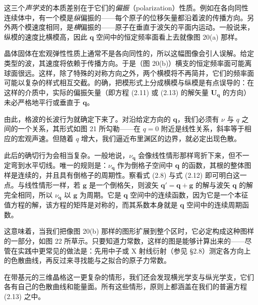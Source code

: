 这三个\emph{声学支}的本质差别在于它们的\emph{偏振}（polarization）性质。例如在各向同性连续体中，有一个模是\emph{纵}偏振的——每个原子的位移矢量都沿着波的传播方向。另外两个模速度相同，是\emph{横}偏振的——原子在垂直于波矢的平面内运动。一般说来，纵模的速度比横模高，因此 $\boldsymbol{q}$ 空间中的恒定频率面看上去就像图 20(a) 那样。

晶体固体在宏观弹性性质上通常不是各向同性的，所以这幅图像会引人误解。给定类型的波，其速度将依赖于传播方向。于是（图 20(b)）横支的恒定频率面可能离球面很远。这样，除了特殊的对称方向之外，两个横模将不再简并，它们的频率面可能以复杂的样式相互交截。的确，把模形式上分成横模与纵模是有点误导的：在这样的介质中，实际的偏振矢量（即方程 (2.11) 或 (2.13) 的解矢量 $\mathbf{U}_{\boldsymbol{q}}$ 的方向）未必严格地平行或垂直于 $\boldsymbol{q}$。

由此，格波的长波行为就确定下来了。对沿给定方向的 $\boldsymbol{q}$，我们必须有 $\nu$ 与 $q$ 之间的一个关系，其形式如图 21 所勾勒——在 $q = 0$ 附近是线性关系，斜率等于相应的宏观声速。但随着 $q$ 增大，我们逼近布里渊区的边界，就必定出现色散。


此后的确切行为会相当复杂。一般地说，$\nu_{\boldsymbol{q}}$ 会像线性情形那样弯折下来，但不一定弯到水平切线。唯一的规则是：$\nu_{\boldsymbol{q}}$ 作为倒格子空间中 $\boldsymbol{q}$ 的函数，其根的整体图样是连续的，并且具有倒格子的周期性。察看式 (2.8) 与式 (2.12) 即可明白这一点。与线性情形一样，若 $\boldsymbol{g}$ 是一个倒格矢，则波矢 $\boldsymbol{q}' = \boldsymbol{q} + \boldsymbol{g}$ 的解与波矢 $\boldsymbol{q}$ 的解完全相同，所以 $\nu_{\boldsymbol{q}}$ 以 $\boldsymbol{g}$ 为周期。它是 $\boldsymbol{q}$ 空间中的连续函数，因为它是一个本征值方程的解，该方程的矩阵是对称的，而其系数本身就是 $\boldsymbol{q}$ 空间中的连续周期函数。

这意味着，当我们把像图 20(b) 那样的图形扩展到整个区时，它必定构成这种图样的一部分，如图 22 所草示。只要知道力常数，这样的图是能够计算出来的——尽管在实践中更常见的做法是：先用中子或 X 射线衍射（参见 §2.8）测定各方向上的色散曲线，再反过来寻找能与之拟合的原子力常数。

在带基元的三维晶格这一更复杂的情形，我们还会发现横光学支与纵光学支，它们各有自己的色散曲线和能量面。所有这些情形，原则上都涵盖在我们的普遍方程 (2.13) 之中。
